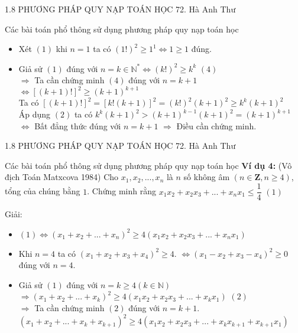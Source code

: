 \begin{frame}{1.8 PHƯƠNG PHÁP QUY NẠP TOÁN HỌC \hspace{2cm}  72. Hà Anh Thư} 
\begin{block}{Các bài toán phổ thông sử dụng phương pháp quy nạp toán học}
\begin{itemize}
    \item Xét $(1)$ khi $n = 1$ ta có $(1!)^2 \ge 1^1 \Leftrightarrow 1 \ge 1$ đúng.
    \pause
    \item Giả sử $(1)$ đúng với $n = k \in \mathbb{N}^* \Leftrightarrow (k!)^2 \ge k^k$ $(4)$ \\
        \pause
        $\Rightarrow$ Ta cần chứng minh $(4)$ đúng với $n = k + 1$ $\Leftrightarrow \left[(k + 1)!\right]^2 \ge (k + 1)^{k + 1}$ \\
        \pause
        Ta có $\left[(k + 1)!\right]^2 = \left[k!(k + 1)\right]^2 = (k!)^2(k + 1)^2 \ge k^k(k + 1)^2$ \\
        \pause
        Áp dụng $(2)$ ta có $k^k(k + 1)^2 > (k + 1)^{k - 1}(k + 1)^2 = (k + 1)^{k + 1}$ \\
        $\Leftrightarrow$ Bất đẳng thức đúng với $n = k + 1$ $\Rightarrow$ Điều cần chứng minh.
\end{itemize}
\end{block}

\end{frame}

\begin{frame}{1.8 PHƯƠNG PHÁP QUY NẠP TOÁN HỌC \hspace{2cm}  72. Hà Anh Thư} 
\begin{block}{Các bài toán phổ thông sử dụng phương pháp quy nạp toán học}
\textbf{Ví dụ 4:} (Vô địch Toán Matxcova 1984) Cho $x_1, x_2, ..., x_n$ là $n$ số không âm $(n \in \mathbf{Z}, n \ge 4)$, tổng của chúng bằng $1$. Chứng minh rằng $x_1x_2 + x_2x_3 + ... + x_nx_1 \le \dfrac{1}{4}$ $(1)$ \\
\pause
\begin{center}
    Giải:
\end{center}
\begin{itemize}
    \item $(1) \Leftrightarrow (x_1 + x_2 + ... + x_n)^2 \ge 4(x_1x_2 + x_2x_3 + ... + x_nx_1)$
    \pause
    \item Khi $n = 4$ ta có $(x_1 + x_2 + x_3 + x_4)^2 \ge 4$. $\Leftrightarrow (x_1 - x_2 + x_3 - x_4)^2 \ge 0$ đúng với $n = 4$.
    \pause
    \item Giả sử $(1)$ đúng với $n = k \ge 4 (k \in \mathbb{N})$ \\
        $\Rightarrow (x_1 + x_2 + ... + x_k)^2 \ge 4(x_1x_2 + x_2x_3 + ... + x_kx_1)$ $(2)$ \\
        \pause
        $\Rightarrow$ Ta cần chứng minh $(2)$ đúng với $n = k + 1$. \\
        $(x_1 + x_2 + ... + x_k + x_{k + 1})^2 \ge 4(x_1x_2 + x_2x_3 + ... + x_kx_{k + 1} + x_{k + 1}x_1)$
\end{itemize}
\end{block}

\end{frame}

